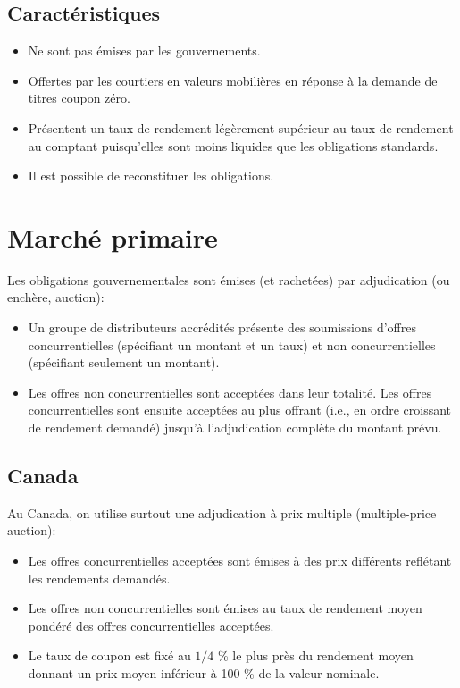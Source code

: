 \documentclass[letterpaper, 12pt]{article}
\newcommand{\1}{\mathds{1}}	%
\theoremstyle{definition}
\begin{document}
\subsection{Caractéristiques}
\begin{itemize}
\item Ne sont pas émises par les gouvernements.
\item Offertes par les courtiers en valeurs mobilières en réponse à la demande de titres coupon zéro.
\item Présentent un taux de rendement légèrement supérieur au taux de rendement au comptant puisqu’elles sont moins liquides que les obligations standards.
\item Il est possible de reconstituer les obligations.
\end{itemize}
\section{Marché primaire}
Les obligations gouvernementales sont émises (et rachetées) par adjudication (ou enchère, auction):
\begin{itemize}
\item Un groupe de distributeurs accrédités présente des soumissions d’offres concurrentielles (spécifiant un montant et un taux) et non concurrentielles (spécifiant seulement un montant).  
\item Les offres non concurrentielles sont acceptées dans leur totalité. Les offres concurrentielles sont ensuite acceptées au plus offrant (i.e., en ordre croissant de rendement demandé) jusqu’à l’adjudication complète du montant prévu. 
\end{itemize}
\subsection{Canada}
Au Canada, on utilise surtout une adjudication à prix multiple (multiple-price auction):  
\begin{itemize}
\item Les offres concurrentielles acceptées sont émises à des prix différents reflétant les rendements demandés.  
\item Les offres non concurrentielles sont émises au taux de rendement moyen pondéré des offres concurrentielles acceptées.
\item Le taux de coupon est fixé au $1/4$ \% le plus près du rendement moyen donnant un prix moyen inférieur à 100 \% de la valeur nominale.  
\end{itemize}
\end{document}
